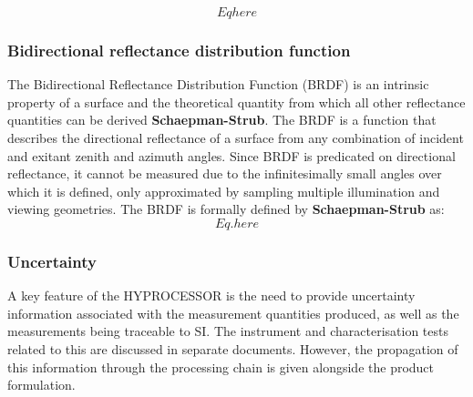 \begin{equation}
Eq here
\label{HCRF_def}
\end{equation}

\subsubsection*{Bidirectional reflectance distribution function}
The Bidirectional Reflectance Distribution Function (BRDF) is an intrinsic property of a surface and the theoretical quantity from which all other reflectance quantities can be derived \textbf{Schaepman-Strub}.
The BRDF is a function that describes the directional reflectance of a surface from any combination of incident and exitant zenith and azimuth angles.
Since BRDF is predicated on directional reflectance, it cannot be measured due to the infinitesimally small angles over which it is defined, only approximated by sampling multiple illumination and viewing geometries.
The BRDF is formally defined by \textbf{Schaepman-Strub} as:
\begin{equation}
Eq. here
\label{BRDF_def}
\end{equation}


\subsubsection{Uncertainty}
A key feature of the HYPROCESSOR is the need to provide uncertainty information associated with the measurement quantities produced, as well as the measurements being traceable to SI.
The instrument and characterisation tests related to this are discussed in separate documents.
However, the propagation of this information through the processing chain is given alongside the product formulation.
